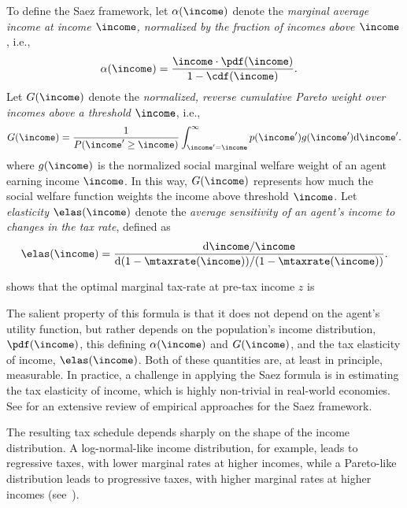 To define the Saez framework, let $\alpha(\income)$ denote the {\em marginal average income at income $\income$, normalized by the fraction of incomes above $\income$}, i.e.,
\begin{align}
\alpha(\income) &= \frac{\income \cdot \pdf(\income)}{1-\cdf(\income)}.
\end{align}
Let $G(\income)$ denote the {\em normalized, reverse cumulative Pareto weight over incomes above a threshold $\income$}, i.e.,
\begin{align}
 G(\income) = \frac{1}{P(\income'\geq \income)} \int_{\income'=\income}^{\infty} p(\income') g(\income') \mathrm{d}\income'.
\end{align}
 where $g(\income)$ is the normalized social marginal welfare weight of an agent earning income $\income$.
In this way, $G(\income)$ represents how much the social welfare function weights the income  above  threshold $\income$.
Let {\em elasticity} $\elas(\income)$ denote the {\em average sensitivity of an agent's income
to changes in the tax rate}, defined as
\begin{align}
 \elas(\income) = \frac{\mathrm{d}\income / \income }{\mathrm{d}(1-\mtaxrate(\income)) / (1-\mtaxrate(\income))}.
\end{align}

\cite{saez_using_2001} shows that the optimal marginal tax-rate at pre-tax income $z$
is

The salient property of this formula is that it does not depend on the agent's utility function, but rather depends  on the population's income distribution, $\pdf(\income)$, this  defining $\alpha(\income)$ and $G(\income)$, and the tax elasticity of income, $\elas(\income)$. Both of these quantities are, at least in principle, measurable.
In practice, a  challenge in applying the Saez formula is in estimating the tax elasticity of income, which is highly non-trivial in real-world economies. See \cite{gruber2002elasticity} for an extensive review of empirical approaches for the Saez framework.

The resulting tax schedule depends sharply on the shape of the income distribution. A log-normal-like income distribution, for example, leads to regressive taxes, with lower marginal rates at higher incomes, while a Pareto-like distribution leads to progressive taxes,  with higher marginal rates at higher incomes (see~\cite{mankiw_optimal_2009}).


